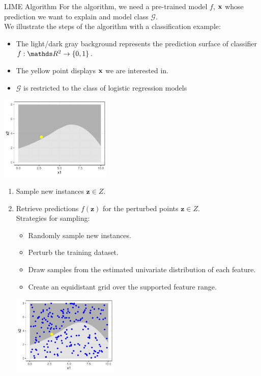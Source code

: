 \documentclass[11pt,compress,t,notes=noshow, xcolor=table]{beamer}
\newcommand{\Gspace}{\mathcal{G}}
\newcommand{\zv}{\mathbf{z}}
\begin{document}
\begin{vbframe}{LIME Algorithm}
		For the algorithm, we need a pre-trained model $f$, $\xv$ whose prediction we want to explain and model class $\Gspace$.\\ \vspace{0.5cm}
		We illustrate the steps of the algorithm with a classification example: 
		\begin{itemize}
			\item The light/dark gray background represents the prediction surface of classifier $f: \R^2 \to \{0, 1\}$.
			\item The yellow point displays $\xv$ we are interested in. 
			\item $\Gspace$ is restricted to the class of logistic regression models 
		\end{itemize}
		\begin{center}
			\includegraphics[width=0.4\textwidth]{figure/lime2}
		\end{center}
	
		\begin{enumerate}
		\framebreak 
		\item Sample new instances $\zv \in Z$. 
		\item Retrieve predictions $f(\zv)$ for the perturbed points $\zv \in Z$. \\[0.2cm]
		
		\hspace{-0.7cm} Strategies for sampling: 
		\begin{itemize}
			\item Randomly sample new instances. 
			\item Perturb the training dataset.
			\item Draw samples from the estimated univariate distribution of each feature.
			\item Create an equidistant grid over the supported feature range.  
		\end{itemize}
		\begin{center}
			\includegraphics[width=0.4\textwidth]{figure/lime3}
		\end{center}
		

\end{enumerate}
\end{vbframe}
\end{document}
